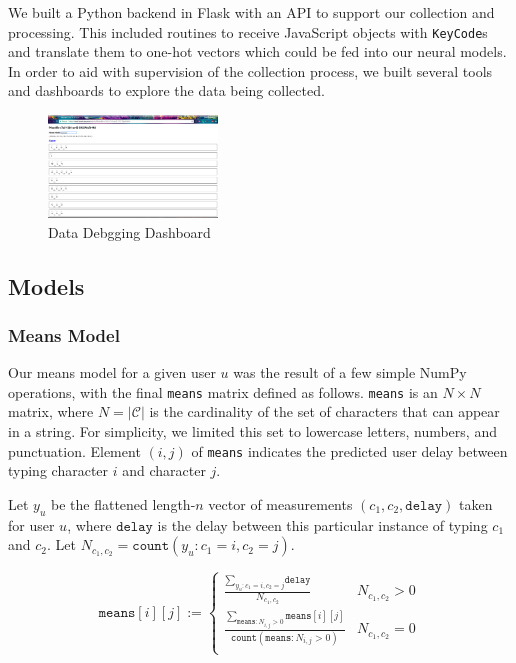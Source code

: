 \documentclass{amsart}
\begin{document}
\begin{multicols*}{2}
We built a Python backend in Flask with an API to support our collection and processing. This included routines to receive JavaScript objects with \texttt{KeyCode}s and translate them to one-hot vectors which could be fed into our neural models. In order to aid with supervision of the collection process, we built several tools and dashboards to explore the data being collected.

\begin{figure}[H]
  \centering
  \includegraphics[width=0.4\textwidth]{admin}
  \caption{Data Debgging Dashboard}
\end{figure}

\subsection{Models}
\subsubsection{Means Model}
Our means model for a given user $u$ was the result of a few simple NumPy operations, with the final \texttt{means} matrix defined as follows. \texttt{means} is an $N \times N$ matrix, where $N = |\mathcal{C}|$ is the cardinality of the set of characters that can appear in a string. For simplicity, we limited this set to lowercase letters, numbers, and punctuation. Element $(i, j)$ of \texttt{means} indicates the predicted user delay between typing character $i$ and character $j$.

Let $y_u$ be the flattened length-$n$ vector of measurements $(c_1, c_2, \texttt{delay})$ taken for user $u$, where $\texttt{delay}$ is the delay between this particular instance of typing $c_1$ and $c_2$. Let $N_{c_1, c_2} = \texttt{count}(y_u : c_1 = i, c_2 = j)$.

\[ \texttt{means}[i][j] :=
  \begin{cases}
      \frac{\sum_{y_u : c_1 = i, c_2 = j}{\texttt{delay}}}{N_{c_1, c_2}} & N_{c_1, c_2} > 0 \\
      \frac{\sum_{\texttt{means} : N_{i, j} > 0}{\texttt{means}[i][j]}}{\texttt{count}(\texttt{means} : N_{i, j} > 0)} & N_{c_1, c_2} = 0 \\
   \end{cases}
\]


\end{multicols*}
\end{document}
